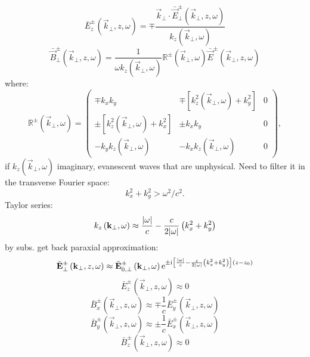 \begin{equation}
\bar{E}^{\pm}_z \left(\vec{k}_\bot, z, \omega \right) = \mp \frac{\vec{k}_\bot \cdot \bar{\vec{E}}^{\pm}_{\bot}(\vec{k}_\bot, z, \omega)}{k_z \left(\vec{k}_\bot, \omega \right)}
\end{equation}
\begin{equation}
\bar{\vec{B}}^{\pm}_{\bot} \left(\vec{k}_\bot, z, \omega \right) = \frac{1}{\omega k_z \left(\vec{k}_\bot, \omega \right)} \mathbb{R}^{\pm} \left(\vec{k}_\bot, \omega \right) \bar{\vec{E}}^{\pm} \left(\vec{k}_\bot, z, \omega \right)
\end{equation}
where:
\begingroup
\renewcommand*{\arraystretch}{1.7}
\begin{equation}
\mathbb{R}^{\pm} \left(\vec{k}_\bot, \omega \right) =  \begin{pmatrix}
\mp k_x k_y & \mp \left[ k_z^2 \left(\vec{k}_\bot, \omega \right) + k_y^2 \right] & 0 \\
\pm \left[ k_z^2 \left(\vec{k}_\bot, \omega \right) + k_x^2 \right] & \pm k_x k_y & 0 \\
- k_y k_z \left(\vec{k}_\bot, \omega \right) & - k_x k_z \left(\vec{k}_\bot, \omega \right) & 0
\end{pmatrix},
\end{equation} 
\endgroup
if $ k_z \left(\vec{k}_\bot, \omega \right) $ imaginary, evanescent waves that are unphysical. Need to filter it in the transverse Fourier space:
\begin{equation}
k^2_x + k^2_y > \omega^2/c^2.
\end{equation}
Taylor series:
\begin{equation}
k_z \left(\mathbf{k}_\bot, \omega \right) \approx \frac{\lvert\omega\rvert}{c} - \frac{c}{2 \lvert\omega\rvert} \left( k_x^2 + k_y^2 \right)  
\end{equation}
by subs. get back paraxial approximation:
\begin{equation}
\bar{\mathbf{E}}^{\pm}_{\bot} \left(\mathbf{k}_\bot, z, \omega \right) \approx \bar{\mathbf{E}}^{\pm}_{0, \bot} \left(\mathbf{k}_\bot, \omega \right) \mathrm{e}^{\pm \mathrm{i} \left[ \frac{\lvert\omega\rvert}{c} - \frac{c}{2 \lvert\omega\rvert} \left( k_x^2 + k_y^2 \right) \right] \left(z - z_0 \right)}
\end{equation}
\begin{equation}
\bar{E}^{\pm}_z \left(\vec{k}_\bot, z, \omega \right) \approx 0
\end{equation}
\begin{equation}
\bar{B}^{\pm}_x \left(\vec{k}_\bot, z, \omega \right) \approx \mp \frac{1}{c} \bar{E}^{\pm}_y \left(\vec{k}_\bot, z, \omega \right)
\end{equation}
\begin{equation}
\bar{B}^{\pm}_y \left(\vec{k}_\bot, z, \omega \right) \approx \pm \frac{1}{c} \bar{E}^{\pm}_x \left(\vec{k}_\bot, z, \omega \right)
\end{equation}
\begin{equation}
\bar{B}^{\pm}_z \left(\vec{k}_\bot, z, \omega \right) \approx 0
\end{equation}

